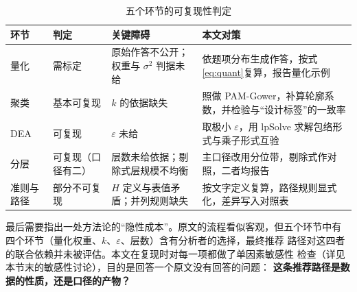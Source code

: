 \begin{table}[htbp]
\centering
\tabfont
\caption{五个环节的可复现性判定}
\label{tab:repro-judge}
\begin{tabularx}{\textwidth}{@{}p{1.3cm}p{2.4cm}p{2.0cm}X@{}}
\toprule
环节 & 判定 & 关键障碍 & 本文对策 \\
\midrule
量化 & 需标定 & 原始作答不公开；权重与 $\sigma^2$ 判据未给 &
  依题项分布生成作答，按式\eqref{eq:quant}复算，报告量化示例 \\
聚类 & 基本可复现 & $k$ 的依据缺失 &
  照做 PAM-Gower，补算轮廓系数，并检验与“设计标签”的一致率 \\
DEA & 可复现 & $\varepsilon$ 未给 &
  取极小 $\varepsilon$，用 lpSolve 求解包络形式与乘子形式互验 \\
分层 & 可复现（口径有二） &
  层数未给依据；剔除式层规模不均衡 &
  主口径改用分位带，剔除式作对照，二者均报告 \\
准则与路径 & 部分不可复现 & $H$ 定义与表值矛盾；并列规则缺失 &
  按文字定义复算，路径规则显式化，差异写入对照表 \\
\bottomrule
\end{tabularx}
\end{table}

最后需要指出一处方法论的“隐性成本”。原文的流程看似客观，但五个环节中有
四个环节（量化权重、$k$、$\varepsilon$、层数）含有分析者的选择，最终推荐
路径对这四者的联合依赖并未被评估。本文在复现时对每一项都做了单因素敏感性
检查（详见本节末的敏感性讨论），目的是回答一个原文没有回答的问题：\textbf{
这条推荐路径是数据的性质，还是口径的产物？}

